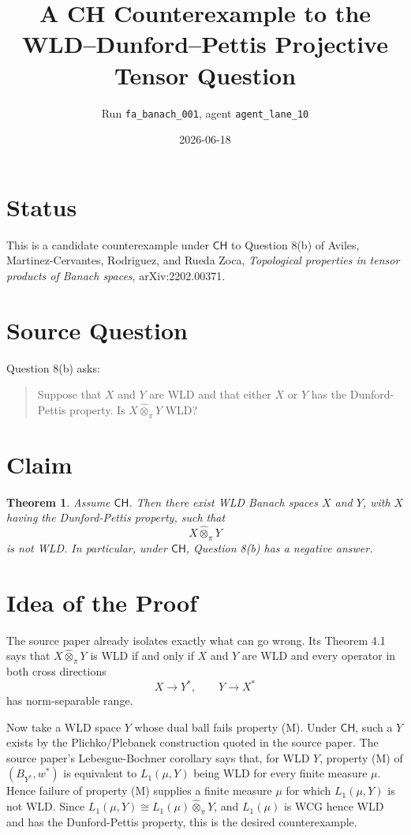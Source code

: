 \documentclass[11pt]{article}
\title{A CH Counterexample to the WLD--Dunford--Pettis Projective Tensor Question}
\author{Run \texttt{fa\_banach\_001}, agent \texttt{agent\_lane\_10}}
\date{2026-06-18}
\newtheorem{theorem}{Theorem}
\newcommand{\otpi}{\widehat{\otimes}_{\pi}}
\newcommand{\weakstar}{w^*}
\newcommand{\CH}{\mathsf{CH}}
\begin{document}
\maketitle

\section*{Status}

This is a candidate counterexample under \(\CH\) to Question 8(b) of Aviles,
Martinez-Cervantes, Rodriguez, and Rueda Zoca, \emph{Topological properties in
tensor products of Banach spaces}, arXiv:2202.00371.

\section*{Source Question}

Question 8(b) asks:

\begin{quote}
Suppose that \(X\) and \(Y\) are WLD and that either \(X\) or \(Y\) has the
Dunford-Pettis property. Is \(X\widehat{\otimes}_{\pi}Y\) WLD?
\end{quote}

\section*{Claim}

\begin{theorem}
Assume \(\CH\).  Then there exist WLD Banach spaces \(X\) and \(Y\), with
\(X\) having the Dunford-Pettis property, such that
\[
X\otpi Y
\]
is not WLD.  In particular, under \(\CH\), Question 8(b) has a negative
answer.
\end{theorem}

\section*{Idea of the Proof}

The source paper already isolates exactly what can go wrong.  Its Theorem 4.1
says that \(X\otpi Y\) is WLD if and only if \(X\) and \(Y\) are WLD and every
operator in both cross directions
\[
X\to Y^*, \qquad Y\to X^*
\]
has norm-separable range.

Now take a WLD space \(Y\) whose dual ball fails property (M).  Under \(\CH\),
such a \(Y\) exists by the Plichko/Plebanek construction quoted in the source
paper.  The source paper's Lebesgue-Bochner corollary says that, for WLD
\(Y\), property (M) of \((B_{Y^*},\weakstar)\) is equivalent to
\(L_1(\mu,Y)\) being WLD for every finite measure \(\mu\).  Hence failure of
property (M) supplies a finite measure \(\mu\) for which \(L_1(\mu,Y)\) is not
WLD.  Since \(L_1(\mu,Y)\cong L_1(\mu)\otpi Y\), and \(L_1(\mu)\) is WCG
hence WLD and has the Dunford-Pettis property, this is the desired
counterexample.
\end{document}
